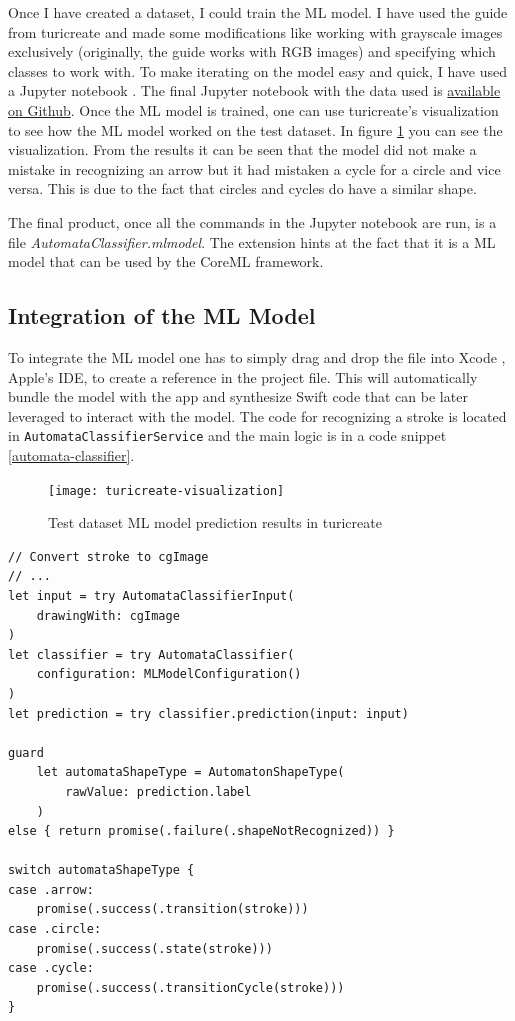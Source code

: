 Once I have created a dataset, I could train the ML model. I have used the guide from turicreate and made some modifications like working with grayscale images exclusively (originally, the guide works with RGB images) and specifying which classes to work with. To make iterating on the model easy and quick, I have used a Jupyter notebook \cite{jupyter}. The final Jupyter notebook with the data used is \href{https://github.com/fortmarek/automata-editor-model/}{available on Github}. Once the ML model is trained, one can use turicreate's visualization to see how the ML model worked on the test dataset. In figure \ref{turicreate-visualization} you can see the visualization. From the results it can be seen that the model did not make a mistake in recognizing an arrow but it had mistaken a cycle for a circle and vice versa. This is due to the fact that circles and cycles do have a similar shape.

The final product, once all the commands in the Jupyter notebook are run, is a file \textit{AutomataClassifier.mlmodel}. The extension hints at the fact that it is a ML model that can be used by the CoreML framework.

\subsection{Integration of the ML Model}

To integrate the ML model one has to simply drag and drop the file into Xcode \cite{xcode}, Apple's IDE, to create a reference in the project file. This will automatically bundle the model with the app and synthesize Swift code that can be later leveraged to interact with the model. The code for recognizing a stroke is located in \lstinline{AutomataClassifierService} and the main logic is in a code snippet \ref{automata-classifier}.

\begin{figure}
    \texttt{[image: turicreate-visualization]}
    \caption{Test dataset ML model prediction results in turicreate}\label{turicreate-visualization}
\end{figure}

\begin{lstlisting}[caption=Automata classifier, label=automata-classifier]
// Convert stroke to cgImage
// ...
let input = try AutomataClassifierInput(
    drawingWith: cgImage
)
let classifier = try AutomataClassifier(
    configuration: MLModelConfiguration()
)
let prediction = try classifier.prediction(input: input)

guard
    let automataShapeType = AutomatonShapeType(
        rawValue: prediction.label
    )
else { return promise(.failure(.shapeNotRecognized)) }

switch automataShapeType {
case .arrow:
    promise(.success(.transition(stroke)))
case .circle:
    promise(.success(.state(stroke)))
case .cycle:
    promise(.success(.transitionCycle(stroke)))
}
\end{lstlisting}

